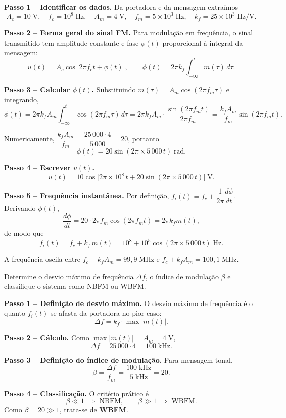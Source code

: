 \documentclass[11pt,a4paper]{article}
\begin{document}
\begin{resolucao}

\textbf{Passo 1 -- Identificar os dados.} Da portadora e da mensagem extraímos
\[
  A_c = 10\;\text{V}, \quad f_c = 10^8\;\text{Hz}, \quad A_m = 4\;\text{V}, \quad f_m = 5\times 10^3\;\text{Hz}, \quad k_f = 25\times 10^3\;\text{Hz/V}.
\]

\textbf{Passo 2 -- Forma geral do sinal FM.} Para modulação em frequência, o sinal transmitido tem amplitude constante e fase $\phi(t)$ proporcional à integral da mensagem:
\[
  u(t) = A_c \cos\!\big[2\pi f_c t + \phi(t)\big], \qquad
  \phi(t) = 2\pi k_f \int_{-\infty}^{t} m(\tau)\,d\tau.
\]

\textbf{Passo 3 -- Calcular $\phi(t)$.} Substituindo $m(\tau) = A_m\cos(2\pi f_m \tau)$ e integrando,
\[
  \phi(t) = 2\pi k_f A_m \int_{-\infty}^{t} \cos(2\pi f_m \tau)\,d\tau
         = 2\pi k_f A_m \cdot \frac{\sin(2\pi f_m t)}{2\pi f_m}
         = \frac{k_f A_m}{f_m}\sin(2\pi f_m t).
\]

Numericamente, $\dfrac{k_f A_m}{f_m} = \dfrac{25\,000 \cdot 4}{5\,000} = 20$, portanto
\[
  \phi(t) = 20\sin(2\pi \times 5\,000\,t)\;\text{rad}.
\]

\textbf{Passo 4 -- Escrever $u(t)$.}
\[
  \boxed{u(t) = 10\cos\!\big[2\pi \times 10^8\,t + 20\sin(2\pi \times 5\,000\,t)\big]\;\text{V}.}
\]

\textbf{Passo 5 -- Frequência instantânea.} Por definição, $f_i(t) = f_c + \dfrac{1}{2\pi}\dfrac{d\phi}{dt}$. Derivando $\phi(t)$,
\[
  \frac{d\phi}{dt} = 20 \cdot 2\pi f_m \cos(2\pi f_m t) = 2\pi k_f m(t),
\]
de modo que
\[
  f_i(t) = f_c + k_f\,m(t) = 10^8 + 10^5\cos(2\pi \times 5\,000\,t)\;\text{Hz}.
\]

A frequência oscila entre $f_c - k_f A_m = 99{,}9\;\text{MHz}$ e $f_c + k_f A_m = 100{,}1\;\text{MHz}$.
\end{resolucao}

\begin{enunciado}[Item b)]
Determine o desvio máximo de frequência $\Delta f$, o índice de modulação $\beta$ e classifique o sistema como NBFM ou WBFM.
\end{enunciado}

\begin{resolucao}

\textbf{Passo 1 -- Definição de desvio máximo.} O desvio máximo de frequência é o quanto $f_i(t)$ se afasta da portadora no pior caso:
\[
  \Delta f = k_f \cdot \max|m(t)|.
\]

\textbf{Passo 2 -- Cálculo.} Como $\max|m(t)| = A_m = 4\;\text{V}$,
\[
  \Delta f = 25\,000 \cdot 4 = \boxed{100\;\text{kHz}.}
\]

\textbf{Passo 3 -- Definição do índice de modulação.} Para mensagem tonal,
\[
  \beta = \frac{\Delta f}{f_m} = \frac{100\;\text{kHz}}{5\;\text{kHz}} = \boxed{20.}
\]

\textbf{Passo 4 -- Classificação.} O critério prático é
\[
  \beta \ll 1 \;\Rightarrow\; \text{NBFM}, \qquad \beta \gg 1 \;\Rightarrow\; \text{WBFM}.
\]
Como $\beta = 20 \gg 1$, trata-se de \textbf{WBFM}.
\end{resolucao}
\end{document}
